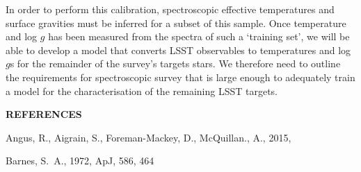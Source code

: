 \documentclass[letterpaper,11pt,preprint]{hack_aastex}
\begin{document}
In order to perform this calibration, spectroscopic effective temperatures and
surface gravities must be inferred for a subset of this sample.
Once temperature and log $g$ has been measured from the spectra of such a
`training set', we will be able to develop a model that converts LSST
observables to temperatures and log $g$s for the remainder of the survey's
targets stars.
We therefore need to outline the requirements for spectroscopic survey that is
large enough to adequately train a model for the characterisation of the
remaining LSST targets.

\begin{multicols}{2}
{\centering\bf REFERENCES\par}
\vspace{0.2em}
\begin{thebibliography}{}%
\raggedright\raggedbottom\scriptsize\setlength{\parskip}{-0.5em}%

Angus, R., Aigrain, S., Foreman-Mackey, D., McQuillan., A., 2015,


Barnes, S.~A., 1972, ApJ, 586, 464



\end{thebibliography}
\end{multicols}
\end{document}
